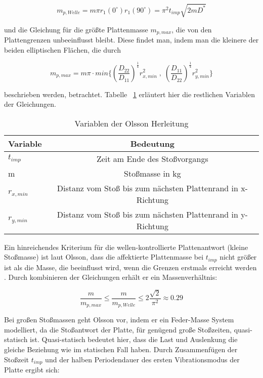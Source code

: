 \begin{equation}
	m_{p,Welle} = m \pi r_{1}(0^{\circ}) r_{1}(90^{\circ}) = \pi^{2} t_{imp} \sqrt{2mD^{*}}
\end{equation}

und die Gleichung für die größte Plattenmasse $m_{p,max}$, die von den Plattengrenzen unbeeinflusst bleibt. Diese findet man, indem man die kleinere der beiden elliptischen Flächen, die durch

\begin{equation}
	m_{p,max} = m \pi \cdot min\{(\frac{D_{22}}{D_{11}})^{\frac{1}{4}} r_{x,min}^{2} \; , \; (\frac{D_{11}}{D_{22}})^{\frac{1}{4}} r_{y,min}^{2} \}
\end{equation}		
		
beschrieben werden, betrachtet. Tabelle ~\ref{tab:Tabelle 2} erläutert hier die restlichen Variablen der Gleichungen.

\begin{table}[h!]
	\begin{center}
		\caption{Variablen der Olsson Herleitung}
		\label{tab:Tabelle 2}
		\begin{tabular}{l|c}
			\textbf{Variable} & \textbf{Bedeutung}\\
			\hline
			$t_{imp}$ & Zeit am Ende des Stoßvorgangs\\
			m & Stoßmasse in kg\\
			$r_{x,min}$ & Distanz vom Stoß bis zum nächsten Plattenrand in x-Richtung\\
			$r_{y,min}$ & Distanz vom Stoß bis zum nächsten Plattenrand in y-Richtung\\
		\end{tabular}
	\end{center}
\end{table}

Ein hinreichendes Kriterium für die wellen-kontrollierte Plattenantwort (kleine Stoßmasse) ist laut Olsson, dass die affektierte Plattenmasse bei $t_{imp}$ nicht größer ist als die Masse, die beeinflusst wird, wenn die Grenzen erstmals erreicht werden \cite{Olsson.2000}. Durch kombinieren der Gleichungen erhält er ein Massenverhältnis:

\begin{equation}
	\frac{m}{m_{p,max}} \leq \frac{m}{m_{p,Welle}} \leq 2 \frac{\sqrt{2}}{\pi^{2}} \approx 0.29
\end{equation}

Bei großen Stoßmassen geht Olsson vor, indem er ein Feder-Masse System modelliert, da die Stoßantwort der Platte, für genügend große Stoßzeiten, quasi-statisch ist. Quasi-statisch bedeutet hier, dass die Last und Auslenkung die gleiche Beziehung wie im statischen Fall haben. Durch Zusammenfügen der Stoßzeit $t_{imp}$ und der halben Periodendauer des ersten Vibrationsmodus der Platte ergibt sich: 

